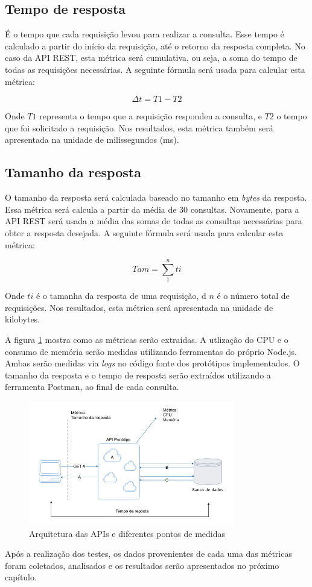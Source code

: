 \subsection*{Tempo de resposta}

É o tempo que cada requisição levou para realizar a consulta. Esse tempo é calculado a partir do início da requisição, até o retorno da resposta completa. No caso da API REST, esta métrica será cumulativa, ou seja, a soma do tempo de todas as requisições necessárias. A seguinte fórmula será usada para calcular esta métrica: 

$$ \Delta t = T1 - T2 $$

Onde $T1$ representa o tempo que a requisição respondeu a consulta, e $T2$ o tempo que foi solicitado a requisição. Nos resultados, esta métrica também será apresentada na unidade de milissegundos (ms).

\subsection*{Tamanho da resposta}

O tamanho da resposta será calculada baseado no tamanho em \textit{bytes} da resposta. Essa métrica será calcula a partir da média de 30 consultas. Novamente, para a API REST será usada a média das somas de todas as consultas necessárias para obter a resposta desejada. A seguinte fórmula será usada para calcular esta métrica: 

$$ Tam = \sum\limits_{1}^{n} ti $$

Onde $ti$ é o tamanha da resposta de uma requisição, d $n$ é o número total de requisições. Nos resultados, esta métrica será apresentada na unidade de kilobytes.

A figura \ref{fig:my-metrics} mostra como as métricas serão extraidas. A utlização do CPU e o consumo de memória serão medidas utilizando ferramentas do próprio Node.js. Ambas serão medidas via \textit{logs} no código fonte dos protótipos implementados. O tamanho da resposta e o tempo de resposta serão extraídos utilizando a ferramenta Postman, ao final de cada consulta.

\begin{figure}[htbp]
\centering
\includegraphics[width=0.8\textwidth]{figuras/metricas.png}
\caption{Arquitetura das APIs e diferentes pontos de medidas}
\label{fig:my-metrics}
\author{fonte: Autor}
\end{figure}

Após a realização dos testes, os dados provenientes de cada uma das métricas foram coletados, analisados e os resultados serão apresentados no próximo capítulo. 